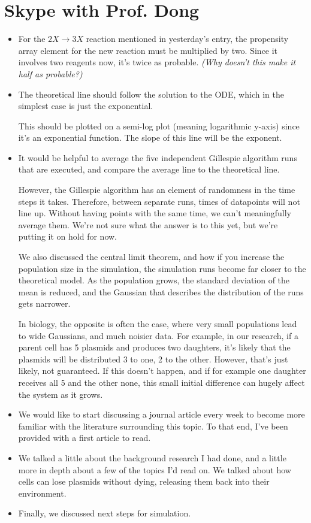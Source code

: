 \documentclass[oneside]{labbook}
\begin{document}
\section*{Skype with Prof. Dong}
\begin{itemize}
  \item For the $2X \rightarrow 3X$ reaction mentioned in yesterday's entry, the
  propensity array element for the new reaction must be multiplied by two. Since
  it involves two reagents now, it's twice as probable. \textit{(Why doesn't this
  make it half as probable?)}

  \item The theoretical line should follow the solution to the ODE, which in the
  simplest case is just the exponential.

  This should be plotted on a semi-log
  plot (meaning logarithmic y-axis) since it's an exponential function. The slope
  of this line will be the exponent.

  \item It would be helpful to average the five independent Gillespie algorithm
  runs that are executed, and compare the average line to the theoretical line.

  However, the Gillespie algorithm has an element of randomness in the time steps
  it takes. Therefore, between separate runs, times of datapoints will not line up.
  Without having points with the same time, we can't meaningfully average them.
  We're not sure what the answer is to this yet, but we're putting it on hold for now.

  We also discussed the central limit theorem, and how if you increase the population
  size in the simulation, the simulation runs become far closer to the theoretical
  model. As the population grows, the standard deviation of the mean is reduced,
  and the Gaussian that describes the distribution of the runs gets narrower.

  In biology, the opposite is often the case, where very small populations lead
  to wide Gaussians, and much noisier data. For example, in our research, if a parent
  cell has 5 plasmids and produces two daughters, it's likely that the plasmids
  will be distributed 3 to one, 2 to the other. However, that's just likely, not
  guaranteed. If this doesn't happen, and if for example one daughter receives all
  5 and the other none, this small initial difference can hugely affect the system
  as it grows.

  \item We would like to start discussing a journal article every week to become
  more familiar with the literature surrounding this topic. To that end, I've
  been provided with a first article to read\cite{thattai}.

  \item We talked a little about the background research I had done, and a little
  more in depth about a few of the topics I'd read on. We talked about how
  cells can lose plasmids without dying, releasing them back into their
  environment.

  \item Finally, we discussed next steps for simulation.
\end{itemize}
\end{document}
